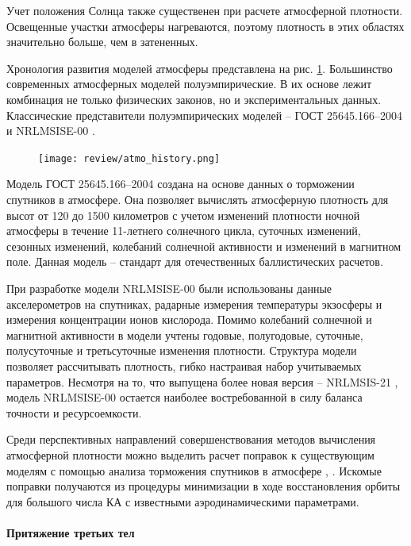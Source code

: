 Учет положения Солнца также существенен при расчете атмосферной плотности.
Освещенные участки атмосферы нагреваются, поэтому плотность в этих областях значительно
больше, чем в затененных.

Хронология развития моделей атмосферы представлена на рис. \ref{fig:atmo_history}.
Большинство современных атмосферных моделей полуэмпирические.
В их основе лежит комбинация не только
физических законов, но и экспериментальных данных. 
Классические представители полуэмпирических моделей 
-- ГОСТ 25645.166--2004 \cite{gost1662004} и NRLMSISE-00 \cite{picone2002}.

\begin{figure}[ht]
      \centering
      \texttt{[image: review/atmo\_history.png]}
      \label{fig:atmo_history}
\end{figure}

Модель ГОСТ 25645.166--2004 создана на основе данных о торможении спутников в атмосфере.
Она позволяет вычислять атмосферную плотность для высот от 120 до 1500 километров с учетом
изменений плотности ночной атмосферы в течение 11-летнего солнечного цикла, суточных изменений,
сезонных изменений, колебаний солнечной активности и изменений в магнитном поле.
Данная модель -- стандарт для отечественных баллистических расчетов.

При разработке модели NRLMSISE-00 были использованы данные акселерометров на спутниках,
радарные измерения температуры экзосферы и измерения концентрации ионов кислорода.
Помимо колебаний солнечной и магнитной активности в модели
учтены годовые, полугодовые, суточные, полусуточные и третьсуточные изменения плотности.
Структура модели позволяет рассчитывать плотность, гибко настраивая набор учитываемых параметров.
Несмотря на то, что выпущена более новая версия -- NRLMSIS-21 \cite{emmert2021, emmert2022}, 
модель NRLMSISE-00 остается наиболее востребованной в силу баланса точности и ресурсоемкости.

Среди перспективных направлений совершенствования методов вычисления атмосферной плотности 
можно выделить расчет поправок к существующим моделям с помощью анализа торможения спутников
в атмосфере \cite{cefola2003}, \cite{tulin2018}. Искомые поправки получаются из процедуры минимизации в ходе
восстановления орбиты для большого числа КА с известными
аэродинамическими параметрами.

\paragraph{Притяжение третьих тел} \mbox{} \\

